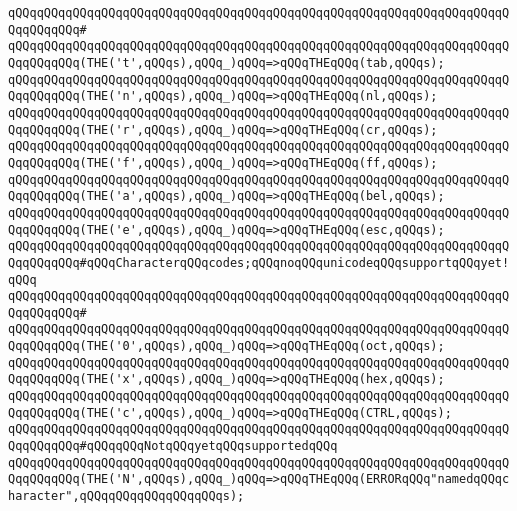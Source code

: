 \verb|qQQqqQQqqQQqqQQqqQQqqQQqqQQqqQQqqQQqqQQqqQQqqQQqqQQqqQQqqQQqqQQqqQQqqQQqqQQqqQQq#|\newline
\verb|qQQqqQQqqQQqqQQqqQQqqQQqqQQqqQQqqQQqqQQqqQQqqQQqqQQqqQQqqQQqqQQqqQQqqQQqqQQqqQQq(THE('t',qQQqs),qQQq_)qQQq=>qQQqTHEqQQq(tab,qQQqs);|\newline
\verb|qQQqqQQqqQQqqQQqqQQqqQQqqQQqqQQqqQQqqQQqqQQqqQQqqQQqqQQqqQQqqQQqqQQqqQQqqQQqqQQq(THE('n',qQQqs),qQQq_)qQQq=>qQQqTHEqQQq(nl,qQQqs);|\newline
\verb|qQQqqQQqqQQqqQQqqQQqqQQqqQQqqQQqqQQqqQQqqQQqqQQqqQQqqQQqqQQqqQQqqQQqqQQqqQQqqQQq(THE('r',qQQqs),qQQq_)qQQq=>qQQqTHEqQQq(cr,qQQqs);|\newline
\verb|qQQqqQQqqQQqqQQqqQQqqQQqqQQqqQQqqQQqqQQqqQQqqQQqqQQqqQQqqQQqqQQqqQQqqQQqqQQqqQQq(THE('f',qQQqs),qQQq_)qQQq=>qQQqTHEqQQq(ff,qQQqs);|\newline
\verb|qQQqqQQqqQQqqQQqqQQqqQQqqQQqqQQqqQQqqQQqqQQqqQQqqQQqqQQqqQQqqQQqqQQqqQQqqQQqqQQq(THE('a',qQQqs),qQQq_)qQQq=>qQQqTHEqQQq(bel,qQQqs);|\newline
\verb|qQQqqQQqqQQqqQQqqQQqqQQqqQQqqQQqqQQqqQQqqQQqqQQqqQQqqQQqqQQqqQQqqQQqqQQqqQQqqQQq(THE('e',qQQqs),qQQq_)qQQq=>qQQqTHEqQQq(esc,qQQqs);|\newline
\newline
\verb|qQQqqQQqqQQqqQQqqQQqqQQqqQQqqQQqqQQqqQQqqQQqqQQqqQQqqQQqqQQqqQQqqQQqqQQqqQQqqQQq#qQQqCharacterqQQqcodes;qQQqnoqQQqunicodeqQQqsupportqQQqyet!qQQq|\newline
\verb|qQQqqQQqqQQqqQQqqQQqqQQqqQQqqQQqqQQqqQQqqQQqqQQqqQQqqQQqqQQqqQQqqQQqqQQqqQQqqQQq#|\newline
\verb|qQQqqQQqqQQqqQQqqQQqqQQqqQQqqQQqqQQqqQQqqQQqqQQqqQQqqQQqqQQqqQQqqQQqqQQqqQQqqQQq(THE('0',qQQqs),qQQq_)qQQq=>qQQqTHEqQQq(oct,qQQqs);|\newline
\verb|qQQqqQQqqQQqqQQqqQQqqQQqqQQqqQQqqQQqqQQqqQQqqQQqqQQqqQQqqQQqqQQqqQQqqQQqqQQqqQQq(THE('x',qQQqs),qQQq_)qQQq=>qQQqTHEqQQq(hex,qQQqs);|\newline
\verb|qQQqqQQqqQQqqQQqqQQqqQQqqQQqqQQqqQQqqQQqqQQqqQQqqQQqqQQqqQQqqQQqqQQqqQQqqQQqqQQq(THE('c',qQQqs),qQQq_)qQQq=>qQQqTHEqQQq(CTRL,qQQqs);|\newline
\newline
\verb|qQQqqQQqqQQqqQQqqQQqqQQqqQQqqQQqqQQqqQQqqQQqqQQqqQQqqQQqqQQqqQQqqQQqqQQqqQQqqQQq#qQQqqQQqNotqQQqyetqQQqsupportedqQQq|\newline
\verb|qQQqqQQqqQQqqQQqqQQqqQQqqQQqqQQqqQQqqQQqqQQqqQQqqQQqqQQqqQQqqQQqqQQqqQQqqQQqqQQq(THE('N',qQQqs),qQQq_)qQQq=>qQQqTHEqQQq(ERRORqQQq"namedqQQqcharacter",qQQqqQQqqQQqqQQqqQQqs);|\newline
